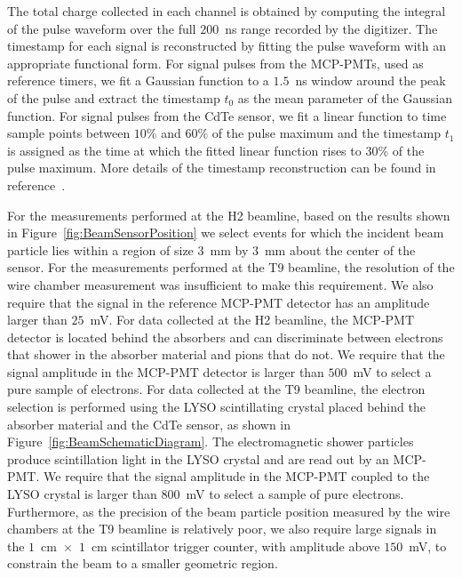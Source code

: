 The total charge collected in each channel is obtained by computing the integral of the pulse
waveform over the full $200$~ns range recorded by the digitizer. 
The timestamp for each signal is reconstructed by fitting the pulse waveform with
an appropriate functional form. For signal pulses from the MCP-PMTs, used as reference timers, 
we fit a Gaussian function to a $1.5$~ns window around the peak of the pulse and extract the 
timestamp $t_{0}$ as the mean parameter of the Gaussian function. For signal pulses from the
CdTe sensor, we fit a linear function to time sample points between $10\%$ and $60\%$ of the pulse
maximum and the timestamp $t_{1}$ is assigned as the time at which the fitted linear function
rises to $30\%$ of the pulse maximum. More details of the timestamp reconstruction can be
found in reference~\cite{Anderson:2015gha}.


For the measurements performed at the H2 beamline, 
based on the results shown in Figure~\ref{fig:BeamSensorPosition} we select events
for which the incident beam particle lies within a region of size $3$~mm by $3$~mm 
about the center of the sensor. For the measurements performed at the T9 beamline,
the resolution of the wire chamber measurement was insufficient to make this 
requirement. We also require that the 
signal in the reference MCP-PMT detector has an amplitude larger than $25$~mV. 
For data collected at the H2 beamline, the MCP-PMT detector is located behind
the absorbers and can discriminate between electrons that shower in the absorber
material and pions that do not. We require that the signal amplitude in the 
MCP-PMT detector is larger than $500$~mV to select a pure sample of electrons. For
data collected at the T9 beamline, the electron selection is performed using
the LYSO scintillating crystal placed behind the absorber material and the CdTe sensor,
as shown in Figure~\ref{fig:BeamSchematicDiagram}. The electromagnetic shower particles produce
scintillation light in the LYSO crystal and are read out by an MCP-PMT. We require that
the signal amplitude in the MCP-PMT coupled to the LYSO crystal is larger than $800$~mV
to select a sample of pure electrons. Furthermore, as the precision of the beam particle position 
measured by the wire chambers at the T9 beamline is relatively poor, we also require
large signals in the $1$~cm~$\times$~$1$~cm scintillator trigger counter, with
amplitude above $150$~mV, to constrain the beam to a smaller geometric region. 
